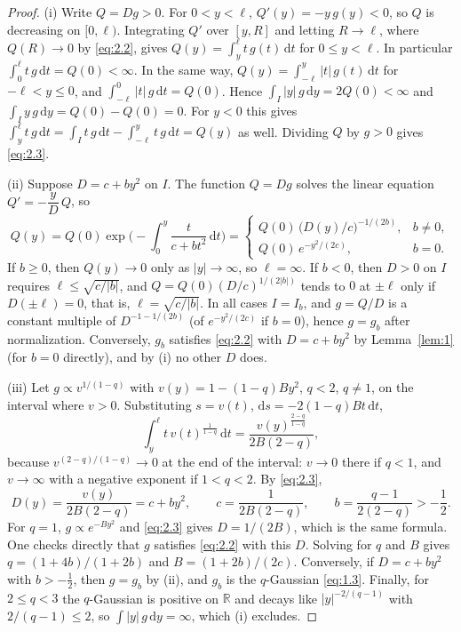 \documentclass[aip,jmp,preprint,onecolumn,floatfix,superscriptaddress,nofootinbib,11pt]{revtex4-2}
\theoremstyle{plain}
\theoremstyle{remark}
\numberwithin{equation}{section}
\newcommand{\dd}{\mathrm{d}}
\begin{document}
\begin{proof}
(i) Write $Q=Dg>0$. For $0<y<\ell$, $Q'(y)=-y\,g(y)<0$, so $Q$ is decreasing on $[0,\ell)$. Integrating $Q'$ over $[y,R]$ and letting $R\to \ell$, where $Q(R)\to0$ by \eqref{eq:2.2}, gives $Q(y)=\int_y^{\ell}t\,g(t)\,\dd t$ for $0\le y<\ell$. In particular $\int_0^{\ell}t\,g\,\dd t=Q(0)<\infty$. In the same way, $Q(y)=\int_{-\ell}^{y}|t|\,g(t)\,\dd t$ for $-\ell<y\le0$, and $\int_{-\ell}^{0}|t|\,g\,\dd t=Q(0)$. Hence $\int_I|y|\,g\,\dd y=2Q(0)<\infty$ and $\int_I y\,g\,\dd y=Q(0)-Q(0)=0$. For $y<0$ this gives $\int_y^{\ell}t\,g\,\dd t=\int_I t\,g\,\dd t-\int_{-\ell}^{y}t\,g\,\dd t=Q(y)$ as well. Dividing $Q$ by $g>0$ gives \eqref{eq:2.3}.
 
(ii) Suppose $D=c+by^{2}$ on $I$. The function $Q=Dg$ solves the linear equation $Q'=-\dfrac{y}{D}\,Q$, so
\begin{equation*}
Q(y)=Q(0)\exp\Big(-\int_0^{y}\frac{t}{c+bt^{2}}\,\dd t\Big)=
\begin{cases} Q(0)\,\big(D(y)/c\big)^{-1/(2b)}, & b\ne0,\\[2pt] Q(0)\,e^{-y^{2}/(2c)}, & b=0.\end{cases}
\end{equation*}
If $b\ge0$, then $Q(y)\to0$ only as $|y|\to\infty$, so $\ell=\infty$. If $b<0$, then $D>0$ on $I$ requires $\ell\le\sqrt{c/|b|}$, and $Q=Q(0)(D/c)^{1/(2|b|)}$ tends to $0$ at $\pm \ell$ only if $D(\pm \ell)=0$, that is, $\ell=\sqrt{c/|b|}$. In all cases $I=I_b$, and $g=Q/D$ is a constant multiple of $D^{-1-1/(2b)}$ (of $e^{-y^{2}/(2c)}$ if $b=0$), hence $g=g_b$ after normalization. Conversely, $g_b$ satisfies \eqref{eq:2.2} with $D=c+by^{2}$ by Lemma~\ref{lem:1} (for $b=0$ directly), and by (i) no other $D$ does.
 
(iii) Let $g\propto v^{1/(1-q)}$ with $v(y)=1-(1-q)By^{2}$, $q<2$, $q\ne1$, on the interval where $v>0$. Substituting $s=v(t)$, $\dd s=-2(1-q)Bt\,\dd t$,
\begin{equation*}
\int_y^{\ell}t\,v(t)^{\frac{1}{1-q}}\,\dd t=\frac{v(y)^{\frac{2-q}{1-q}}}{2B(2-q)},
\end{equation*}
because $v^{(2-q)/(1-q)}\to0$ at the end of the interval: $v\to0$ there if $q<1$, and $v\to\infty$ with a negative exponent if $1<q<2$. By \eqref{eq:2.3},
\begin{equation*}
D(y)=\frac{v(y)}{2B(2-q)}=c+by^{2},\qquad c=\frac{1}{2B(2-q)},\qquad b=\frac{q-1}{2(2-q)}>-\frac12 .
\end{equation*}
For $q=1$, $g\propto e^{-By^{2}}$ and \eqref{eq:2.3} gives $D=1/(2B)$, which is the same formula. One checks directly that $g$ satisfies \eqref{eq:2.2} with this $D$. Solving for $q$ and $B$ gives $q=(1+4b)/(1+2b)$ and $B=(1+2b)/(2c)$. Conversely, if $D=c+by^{2}$ with $b>-\tfrac12$, then $g=g_b$ by (ii), and $g_b$ is the $q$-Gaussian \eqref{eq:1.3}. Finally, for $2\le q<3$ the $q$-Gaussian is positive on $\mathbb R$ and decays like $|y|^{-2/(q-1)}$ with $2/(q-1)\le2$, so $\int|y|\,g\,\dd y=\infty$, which (i) excludes.
\end{proof}
 
\end{document}
